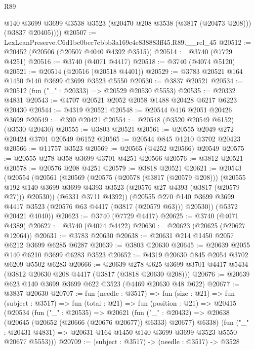 \begin{lexlean}{R89}
\begin{coremodule}
          @140
          @3699
          @3699
          @3538
          @3523
          (@20470 @208 @3538 (@3817 (@20473 @208)))
          (@3837 @20405))))
@20507 := LexLeanPreserve.C6d1bc0bcc7cbbb3a169c4e838883ff45.R89.__rel_45
@20512 := @20452 (@20506 (@20507 @4040 @4392 @3515))
@20514 := @3740 (@7729 @4251)
@20516 := @3740 (@4071 @4417)
@20518 := @3740 (@4074 @5120)
@20521 := @20514 (@20516 (@20518 @4401))
@20529 := @3783 @20521 @164 @1450 @140 @3699 @3699 @3523 @5550
@20530 := @3837 @20521
@20534 := @20512 (fun ("_" : @20333) => @20529 @20530 @5553)
@20535 := @20332 @4831
@20543 := @4707 @20521 @2052 @2058 @1488 @20428 @6217 @6223 @20430
@20544 := @4319 @20521
@20548 := @20544 @416 @2051 @20426 @3699
@20549 := @390 @20421
@20554 := @20548 (@3520 @20549 @6152) (@3530 @20430)
@20555 := @3803 @20521
@20561 := @20555 @2049 @272 @20424 @3701 @20549 @6152
@20565 := @20544 @845 @1210 @3702 @20423
@20566 := @11757 @3523
@20569 := @20565 (@4252 @20566) @20549
@20575 := @20555 @278 @358 @3699 @3701 @4251 @20566
@20576 := @3812 @20521
@20578 := @20576 @208 @4251
@20579 := @3818 @20521
@20621 := @20543
    (@20554
      (@20561
        (@20569
          (@20575
            (@20578 (@3817 (@20579 @208)))
            (@20555
              @192
              @140
              @3699
              @3699
              @4393
              @3523
              (@20576 @27 @4393 (@3817 (@20579 @27)))
              @20530))
          (@6331 @3711 @4392))
        (@20555 @270 @140 @3699 @3699 @4417 @3523 (@20576 @63 @4417 (@3817 (@20579 @63))) @20530))
      (@5372 @20421 @4040))
@20623 := @3740 (@7729 @4417)
@20625 := @3740 (@4071 @4389)
@20627 := @3740 (@4074 @4422)
@20630 := @20623 (@20625 (@20627 @12064))
@20631 := @3783 @20630
@20638 := @20631 @214 @1450 @2057 @6212 @3699 @6285 @6287
@20639 := @3803 @20630
@20645 := @20639 @2055 @140 @6210 @3699 @6283 @3523
@20652 := @4319 @20630 @845 @2054 @3702 @6209 @5502 @6283
@20666 := @20639
    @278
    @625
    @3699
    @3701
    @4417
    @5434
    (@3812 @20630 @208 @4417 (@3817 (@3818 @20630 @208)))
@20676 := @20639 @623 @140 @3699 @3699 @622 @3523 (@4469 @20630 @48 @622)
@20677 := @3837 @20630
@20707 := fun (needle : @3517) =>
  fun (size : @21) =>
  fun (subject : @3517) =>
  fun (total : @21) =>
  fun (position : @21) =>
  @20415
    (@20534
      (fun ("_" : @20535) =>
      @20621
        (fun ("_" : @20432) => @20638 (@20645 (@20652 (@20666 (@20676 @20677)) @6333) @20677) @6338)
        (fun ("_" : @20431 @4831) => @20631 @164 @1450 @140 @3699 @3699 @3523 @5550 @20677 @5553)))
@20709 := (subject : @3517) -> (needle : @3517) -> @3528

\end{coremodule}
\end{lexlean}
